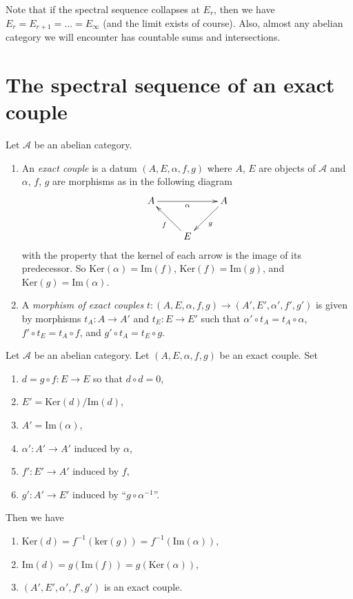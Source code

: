 \noindent
Note that if the spectral sequence collapses at $E_r$, then
we have $E_r = E_{r + 1} = \ldots = E_{\infty}$ (and the limit
exists of course). Also, almost any abelian category we will encounter
has countable sums and intersections.











\section{The spectral sequence of an exact couple}
\label{section-exact-couple}

\begin{definition}
\label{definition-exact-couple}
Let $\mathcal{A}$ be an abelian category.
\begin{enumerate}
\item An {\it exact couple} is a datum $(A, E, \alpha, f, g)$ where
$A$, $E$ are objects of $\mathcal{A}$ and $\alpha$, $f$, $g$
are morphisms as in the following diagram
$$
\xymatrix{
A \ar[rr]_{\alpha} & & A \ar[ld]^g \\
& E \ar[lu]^f &
}
$$
with the property that the kernel of each arrow is the image
of its predecessor. So $\text{Ker}(\alpha) = \text{Im}(f)$,
$\text{Ker}(f) = \text{Im}(g)$, and $\text{Ker}(g) = \text{Im}(\alpha)$.
\item A {\it morphism of exact couples}
$t : (A, E, \alpha, f, g) \to (A', E', \alpha', f', g')$
is given by morphisms $t_A : A \to A'$ and
$t_E : E \to E'$ such that
$\alpha' \circ t_A = t_A \circ \alpha$, 
$f' \circ t_E = t_A \circ f$, and
$g' \circ t_A = t_E \circ g$.
\end{enumerate}
\end{definition}

\begin{lemma}
\label{lemma-derived-exact-couple}
Let $\mathcal{A}$ be an abelian category.
Let $(A, E, \alpha, f, g)$ be an exact couple.
Set
\begin{enumerate}
\item $d = g \circ f : E \to E$ so that $d \circ d = 0$,
\item $E' = \text{Ker}(d)/\text{Im}(d)$,
\item $A' = \text{Im}(\alpha)$,
\item $\alpha' : A' \to A'$ induced by $\alpha$,
\item $f' : E' \to A'$ induced by $f$,
\item $g' : A' \to E'$ induced by ``$g \circ \alpha^{-1}$''.
\end{enumerate}
Then we have
\begin{enumerate}
\item $\text{Ker}(d) = f^{-1}(\text{ker}(g)) = f^{-1}(\text{Im}(\alpha))$,
\item $\text{Im}(d) = g(\text{Im}(f)) = g(\text{Ker}(\alpha))$,
\item $(A', E', \alpha', f', g')$ is an exact couple.
\end{enumerate}
\end{lemma}

